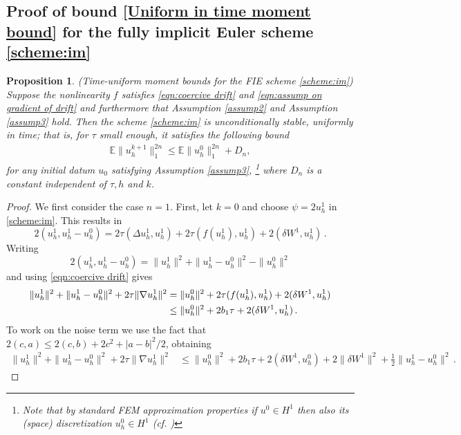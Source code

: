 \documentclass[reqno, 11pt]{amsart}
\theoremstyle{plain}
\newtheorem{proposition}[theorem]{Proposition}
\theoremstyle{definition}
\theoremstyle{remark}
\numberwithin{equation}{section}
\numberwithin{theorem}{section}
\begin{document}
{\subsection{Proof of bound \ref{Uniform in time moment bound} for the fully implicit Euler scheme \eqref{scheme:im}}\label{subsec:proof of H3 for implicit}
\begin{proposition}\label{prop:moment bound for implicit scheme}
(Time-uniform moment bounds for the FIE scheme \eqref{scheme:im}) %
Suppose the nonlinearity $f$ satisfies \eqref{eqn:coercive drift} and \eqref{eqn:assump on gradient of drift} and furthermore that Assumption \ref{assump2} and Assumption \ref{assump3} hold. 
Then the scheme  \eqref{scheme:im} is unconditionally stable, uniformly in time; that is, for $\tau$ small enough,  it satisfies the following bound
\begin{align}
\mathbb{E} \| u_h^{k+1}\|_1^{2n}\leq \mathbb E \|u_h^0\|_1^{2n}+D_n,
\end{align}
for any initial datum $u_0$ satisfying Assumption \ref{assump3},  \footnote{Note that by standard FEM approximation properties if $u^0 \in H^1$ then also its (space) discretization $u^0_h \in H^1$ (cf. \cite[Page 96]{QuarteroniV97}) }
where $D_n$ is a constant  independent of $\tau, h$ and $k$. 
\end{proposition}
\begin{proof}
We first consider the case $n=1$. First, let $k=0$ and choose $\psi=2 u_h^1$ in \eqref{scheme:im}.
This results in
$$
2(u_h^{1}, u_h^1-u_h^0) =  2\tau (\Delta u_h^{1}, u_h^{1})  +
2\tau(f(u_h^{1}), u_h^{1}) + 2(\delta W^1, u_h^{1}) \,.
$$
Writing
\begin{equation}\label{eqn: AA}
2(u_h^{1}, u_h^1-u_h^0) = \|u_h^{1}\|^2+\|u_h^{1}-u_h^{0}\|^2-\|u_h^{0}\|^2
\end{equation}
and using \eqref{eqn:coercive drift} gives
\begin{align}
\| u_h^1\|^2+\|u_h^1-u_h^0\|^2+2\tau\|\nabla u_h^1\|^2 & =\| u_h^0\|^2+2\tau ( f(u_h^1), u_h^1)+2(\delta W^1, u_h^1)\notag\\
&\leq \| u_h^0\|^2+2b_1\tau+2(\delta W^1, u_h^1) \,.\notag
\end{align}
To work on the noise term we use the fact that $2(c,a)\leq 2(c,b)+2c^2 + |a-b|^2/2$, obtaining 
\begin{align}\label{eq:imL2}
\| u_h^1\|^2+\|u_h^1-u_h^0\|^2+2\tau\|\nabla u_h^1\|^2 &\leq \| u_h^0\|^2+2b_1\tau +2( \delta W^1, u_h^0)+2\|\delta W^1\|^2+\frac{1}{2}\| u_h^1- u_h^0\|^2 \,.

\end{align}
\end{proof}}
\end{document}
